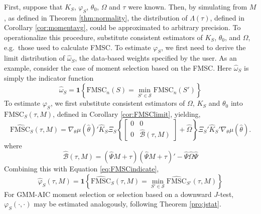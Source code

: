 \documentclass[12pt]{article}
\theoremstyle{definition}
\begin{document}
First, suppose that $K_S$, $\varphi_S$, $\theta_0$, $\Omega$ and $\tau$ were known. 
Then, by simulating from $M$, as defined in Theorem \ref{thm:normality}, the distribution of $\Lambda(\tau)$, defined in Corollary \ref{cor:momentavg}, could be approximated to arbitrary precision. 
To operationalize this procedure, substitute consistent estimators of $K_S$, $\theta_0$, and $\Omega$, e.g.\ those used to calculate FMSC. 
To estimate $\varphi_S$, we first need to derive the limit distribution of $\widehat{\omega}_S$, the data-based weights specified by the user. 
As an example, consider the case of moment selection based on the FMSC. Here $\widehat{\omega}_S$ is simply the indicator function
\begin{equation}
	\label{eq:FMSCindicate}
	\widehat{\omega}_S = \mathbf{1}\left\{\mbox{FMSC}_n(S) = \min_{S'\in \mathscr{S}} \mbox{FMSC}_n(S')\right\}
\end{equation}
To estimate $\varphi_S$, we first substitute consistent estimators of $\Omega$, $K_S$ and $\theta_0$ into $\mbox{FMSC}_S(\tau,M)$, defined in Corollary \ref{cor:FMSClimit}, yielding,
\begin{equation}
	\widehat{\mbox{FMSC}}_S(\tau,M) = \nabla_\theta\mu(\widehat{\theta})'\widehat{K}_S\Xi_S \left\{\left[\begin{array}{cc}0&0\\0&\widehat{\mathcal{B}}(\tau,M) \end{array}\right] + \widehat{\Omega}\right\}\Xi_S'\widehat{K}_S'\nabla_\theta\mu(\widehat{\theta}).
\end{equation}
where
\begin{equation}
	\widehat{\mathcal{B}}(\tau,M) = (\widehat{\Psi} M + \tau)(\widehat{\Psi} M + \tau)' - \widehat{\Psi} \widehat{\Omega} \widehat{\Psi}
\end{equation}
Combining this with Equation \ref{eq:FMSCindicate},
\begin{equation}
\label{eq:omegahat}
	\widehat{\varphi}_S(\tau,M) = \mathbf{1}\left\{\widehat{\mbox{FMSC}}_S(\tau,M) = \min_{S'\in \mathscr{S}} \widehat{\mbox{FMSC}}_{S'}(\tau,M)\right\}
\end{equation}
For GMM-AIC moment selection or selection based on a downward $J$-test, $\varphi_S(\cdot,\cdot)$ may be estimated analogously, following  Theorem \ref{pro:jstat}. 
\end{document}
